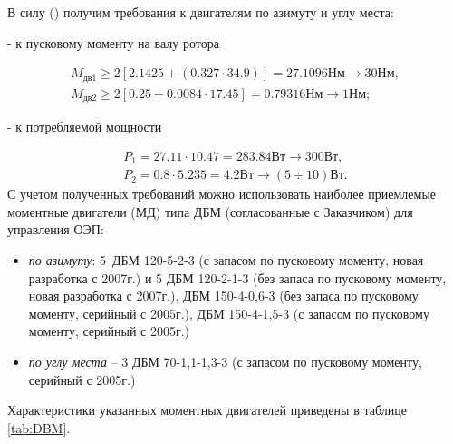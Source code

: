 В силу () получим требования к двигателям по азимуту и углу места:\par

- к пусковому моменту на валу ротора

\begin{equation}%
\label{eq:p4:4+3}
\begin{multlined}
M_{\textit{дв1}} \geq 2 \left[ 2.1425 + \left( 0.327 \cdot 34.9 \right)  \right] =27.1096\textit{Нм} \rightarrow 30\textit{Нм}, \\
M_{\textit{дв2}} \geq 2 \left[ 0.25 + 0.0084 \cdot 17.45 \right] =0.79316\textit{Нм} \rightarrow 1\textit{Нм};
\end{multlined}
\end{equation}

- к потребляемой мощности

\begin{equation}%
\label{eq:p4:4+4}
\begin{multlined}
P_{1}=27.11 \cdot 10.47=283.84\textit{Вт} \rightarrow 300\textit{Вт}, \\
P_{2}=0.8 \cdot 5.235=4.2\textit{Вт} \rightarrow  \left( 5 \div 10 \right) \textit{Вт}.
\end{multlined}
\end{equation}
С учетом полученных требований можно использовать наиболее приемлемые моментные двигатели (МД) типа ДБМ (согласованные с Заказчиком) для управления ОЭП:

\begin{itemize}
	\item \textit{по азимуту}: 5\ ДБМ 120-5-2-3 (с запасом по пусковому моменту, новая разработка с 2007г.)  и 5 ДБМ 120-2-1-3 (без запаса по пусковому моменту, новая разработка с 2007г.), ДБМ 150-4-0,6-3 (без запаса по пусковому моменту, серийный с 2005г.), ДБМ 150-4-1,5-3 (с запасом по пусковому моменту, серийный с 2005г.)
	\item \textit{по углу места} – 3 ДБМ 70-1,1-1,3-3 (с запасом по пусковому моменту, серийный с 2005г.)
\end{itemize}

Характеристики указанных моментных двигателей приведены в таблице \ref{tab:DBM}. \par

